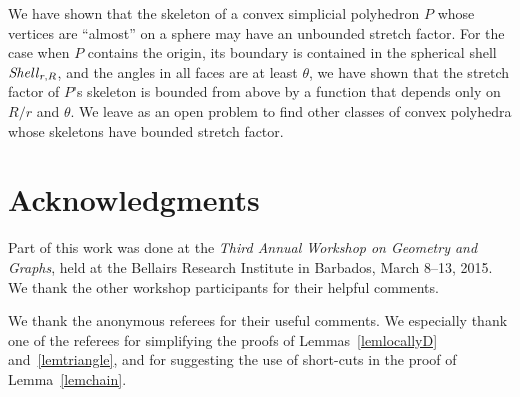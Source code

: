 \documentclass[12pt]{article}
\newcommand{\Shell}{\mathord{\it Shell}}
\begin{document}
We have shown that the skeleton of a convex simplicial polyhedron $P$ 
whose vertices are ``almost'' on a sphere may have an unbounded 
stretch factor. For the case when $P$ contains the origin, its 
boundary is contained in the spherical shell $\Shell_{r,R}$, and the 
angles in all faces are at least $\theta$, we have shown that the stretch 
factor of $P$'s skeleton is bounded from above by a function that 
depends only on $R/r$ and $\theta$. We leave as an open problem to find 
other classes of convex polyhedra whose skeletons have bounded stretch 
factor. 
      

\section*{Acknowledgments} 
Part of this work was done at the 
\emph{Third Annual Workshop on Geometry and Graphs}, held at the 
Bellairs Research Institute in Barbados, March 8--13, 2015.  
We thank the other workshop participants for their helpful comments. 

We thank the anonymous referees for their useful comments. 
We especially thank one of the referees for simplifying the proofs of 
Lemmas~\ref{lemlocallyD} and~\ref{lemtriangle}, and for suggesting 
the use of short-cuts in the proof of Lemma~\ref{lemchain}.  
\end{document}

